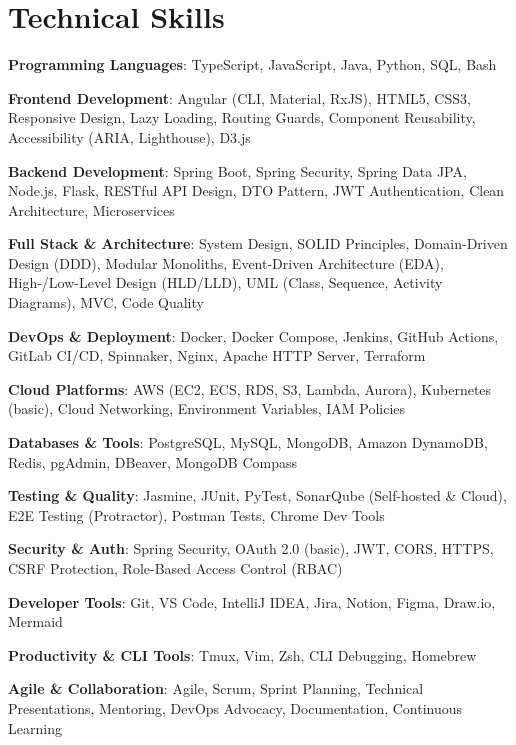 \documentclass[10pt, letterpaper]{article}
\newenvironment{onecolentry}{\begin{adjustwidth}{0 cm}{0 cm}}{\end{adjustwidth}}
\begin{document}
\section{Technical Skills}
\begin{onecolentry}
    \item \textbf{Programming Languages}: TypeScript, JavaScript, Java, Python, SQL, Bash
    \item \textbf{Frontend Development}: Angular (CLI, Material, RxJS), HTML5, CSS3, Responsive Design, Lazy Loading, Routing Guards, Component Reusability, Accessibility (ARIA, Lighthouse), D3.js
    \item \textbf{Backend Development}: Spring Boot, Spring Security, Spring Data JPA, Node.js, Flask, RESTful API Design, DTO Pattern, JWT Authentication, Clean Architecture, Microservices
    \item \textbf{Full Stack \& Architecture}: System Design, SOLID Principles, Domain-Driven Design (DDD), Modular Monoliths, Event-Driven Architecture (EDA), High-/Low-Level Design (HLD/LLD), UML (Class, Sequence, Activity Diagrams), MVC, Code Quality
    \item \textbf{DevOps \& Deployment}: Docker, Docker Compose, Jenkins, GitHub Actions, GitLab CI/CD, Spinnaker, Nginx, Apache HTTP Server, Terraform
    \item \textbf{Cloud Platforms}: AWS (EC2, ECS, RDS, S3, Lambda, Aurora), Kubernetes (basic), Cloud Networking, Environment Variables, IAM Policies
    \item \textbf{Databases \& Tools}: PostgreSQL, MySQL, MongoDB, Amazon DynamoDB, Redis, pgAdmin, DBeaver, MongoDB Compass
    \item \textbf{Testing \& Quality}: Jasmine, JUnit, PyTest, SonarQube (Self-hosted \& Cloud), E2E Testing (Protractor), Postman Tests, Chrome Dev Tools
    \item \textbf{Security \& Auth}: Spring Security, OAuth 2.0 (basic), JWT, CORS, HTTPS, CSRF Protection, Role-Based Access Control (RBAC)
    \item \textbf{Developer Tools}: Git, VS Code, IntelliJ IDEA, Jira, Notion, Figma, Draw.io, Mermaid
    \item \textbf{Productivity \& CLI Tools}: Tmux, Vim, Zsh, CLI Debugging, Homebrew
    \item \textbf{Agile \& Collaboration}: Agile, Scrum, Sprint Planning, Technical Presentations, Mentoring, DevOps Advocacy, Documentation, Continuous Learning
\end{onecolentry}
\end{document}
